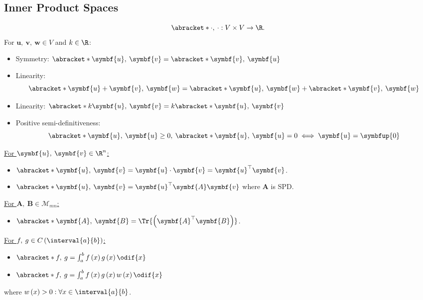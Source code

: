 \documentclass{article}
\begin{document}
\begin{multicols*}{3}
    \subsection{Inner Product Spaces}
    \begin{equation*}
        \abracket*{\cdot,\: \cdot} : V \times V \to \R.
    \end{equation*}
    For \(\symbf{u},\: \symbf{v},\: \symbf{w} \in V\)
    and \(k \in \R\):
    \begin{itemize}
        \item Symmetry: \(\abracket*{\symbf{u},\: \symbf{v}} =
              \abracket*{\symbf{v},\: \symbf{u}}\)
        \item Linearity:
              \begin{equation*}
                  \abracket*{\symbf{u} + \symbf{v},\: \symbf{w}} = \abracket*{\symbf{u},\: \symbf{w}} + \abracket*{\symbf{v},\: \symbf{w}}
              \end{equation*}
        \item Linearity: \(\abracket*{k \symbf{u},\: \symbf{v}} =
              k\abracket*{\symbf{u},\: \symbf{v}}\)
        \item Positive semi-definitiveness:
              \begin{equation*}
                  \abracket*{\symbf{u},\: \symbf{u}} \geq 0,\: \abracket*{\symbf{u},\: \symbf{u}} = 0 \iff \symbf{u} = \symbfup{0}
              \end{equation*}
    \end{itemize}
    \underline{For \(\symbf{u},\: \symbf{v} \in \R^n\):}
    \begin{itemize}
        \item \(\abracket*{\symbf{u},\: \symbf{v}} = \symbf{u} \cdot \symbf{v} = \symbf{u}^\top \symbf{v}\).
        \item \(\abracket*{\symbf{u},\: \symbf{v}} = \symbf{u}^\top \symbf{A} \symbf{v}\) where \(\symbf{A}\) is SPD\@.
    \end{itemize}
    \underline{For \(\symbf{A},\: \symbf{B} \in \mathscr{M}_{mn}\):}
    \begin{itemize}
        \item \(\abracket*{\symbf{A},\: \symbf{B}} = \Tr{\left( \symbf{A}^\top \symbf{B} \right)}\).
    \end{itemize}
    \underline{For \(f,\: g \in C\left( \interval{a}{b} \right)\):}
    \begin{itemize}
        \item \(\abracket*{f,\: g} = \int_a^b f\left( x \right) g\left( x \right) \odif{x}\)
        \item \(\abracket*{f,\: g} = \int_a^b f\left( x \right) g\left( x \right) w\left( x \right) \odif{x}\)
    \end{itemize}
    where \(w\left( x \right) > 0 : \forall x \in \interval{a}{b}\).

\end{multicols*}
\end{document}
